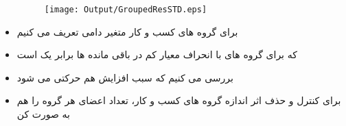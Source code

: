 \documentclass[12pt, a4paper]{article}
\begin{document}
\begin{itemize}
	\lr{\begin{LTR}
	\begin{table}[htbp]
			\centering
			\resizebox{0.8\textwidth}{!}{
				
			}
			\label{tab:ResidualTrunStdSummary}
		\end{table}
	\end{LTR}}
	\begin{figure}[htbp]
		\centering
		\texttt{[image: Output/GroupedResSTD.eps]}
		\label{fig:GroupedResSTD}
	\end{figure}
	\item
	برای گروه های کسب و کار متغیر دامی تعریف می کنیم
		\item
		که برای گروه های با انحراف معیار کم در باقی مانده ها برابر یک است
			\item
			بررسی می کنیم که سبب افزایش هم حرکتی می شود
				\item
				برای کنترل و حذف اثر اندازه گروه های کسب و کار، تعداد اعضای هر گروه را هم به صورت کن
\lr{\begin{LTR}
		\begin{table}[htbp]
	\centering
			\resizebox{0.8\textwidth}{!}{
				\centering
				
			}
			\label{Turnovercrosssection}
		\end{table}
\end{LTR}}
%

\end{itemize}
\end{document}
